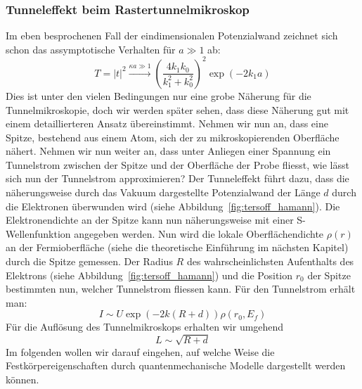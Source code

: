 \subsubsection{Tunneleffekt beim Rastertunnelmikroskop}
Im eben besprochenen Fall der eindimensionalen Potenzialwand zeichnet sich schon das
assymptotische Verhalten für $a\gg1$ ab:
\begin{equation}
    T = \left | t \right |^2 \overset{\kappa a \gg 1}{\rightarrow} (\frac{4k_1k_0}{k_1^2+k_0^2})^2 
    \exp(-2k_1a)
\end{equation}
Dies ist unter den vielen Bedingungen nur eine grobe Näherung für die Tunnelmikroskopie, doch
wir werden später sehen, dass diese Näherung gut mit einem detaillierteren Ansatz übereinstimmt.
Nehmen wir nun an, dass eine Spitze, bestehend aus einem Atom, sich der zu mikroskopierenden
Oberfläche nähert. Nehmen wir nun weiter an, dass unter Anliegen einer Spannung ein Tunnelstrom
zwischen der Spitze und der Oberfläche der Probe fliesst, wie lässt sich nun der Tunnelstrom
approximieren? Der Tunneleffekt führt dazu, dass die näherungsweise durch das Vakuum 
dargestellte Potenzialwand der Länge $d$ durch die Elektronen überwunden wird (siehe
Abbildung~\ref{fig:tersoff_hamann}). Die Elektronendichte an der Spitze kann nun näherungsweise
mit einer S-Wellenfunktion angegeben werden\cite{staatsexamen}. 
Nun wird die lokale Oberflächendichte $\rho(r)$ an
der Fermioberfläche (siehe die theoretische Einführung
im nächsten Kapitel) durch die Spitze gemessen. Der Radius $R$ des wahrscheinlichsten Aufenthalts
des Elektrons (siehe Abbildung~\ref{fig:tersoff_hamann}) und die Position $r_0$ der Spitze 
bestimmten nun, welcher Tunnelstrom fliessen kann.
Für den Tunnelstrom erhält man:
\begin{equation}
    I \sim U \exp(-2k(R+d)) \rho(r_0,E_f)
\end{equation}
Für die Auflösung des Tunnelmikroskops erhalten wir umgehend
\begin{equation}
    L \sim \sqrt{R+d} 
\end{equation}
Im folgenden wollen wir darauf eingehen, auf welche Weise die Festkörpereigenschaften
durch quantenmechanische Modelle dargestellt werden können. 
